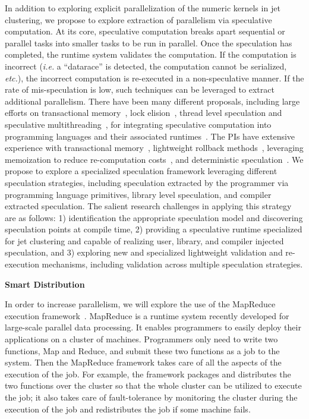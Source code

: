 \documentclass[times,11pt]{article}
\begin{document}
In addition to exploring explicit parallelization of the numeric kernels in jet clustering, we
propose to explore extraction of parallelism via speculative computation. At its core, speculative
computation breaks apart sequential or parallel tasks into smaller tasks to be run in parallel. Once
the speculation has completed, the runtime system validates the computation. If the computation is
incorrect ({\em i.e.} a ``datarace'' is detected, the computation cannot be serialized, {\em etc.}), the
incorrect computation is re-executed in a non-speculative manner.  If the rate of mis-speculation
is low, such techniques can be leveraged to extract additional
parallelism. 
There have been many different
proposals, including large efforts on transactional memory~\cite{},
lock elision~\cite{}, thread level speculation and speculative
multithreading~\cite{},
 for integrating speculative computation into programming languages
 and their associated runtimes~\cite{}.
The PIs have extensive experience with transactional memory~\cite{trans}, lightweight rollback methods~\cite{stab}, 
leveraging memoization to reduce re-computation costs~\cite{memo1, memo2},
and deterministic speculation~\cite{iso}. We propose to explore a specialized speculation framework leveraging different
speculation strategies, including speculation extracted by the programmer via programming language primitives,
library level speculation, and compiler extracted speculation.
The salient research
challenges in applying this strategy are as follows:  1) identification the appropriate speculation model and
discovering speculation points at compile time, 2) providing a speculative runtime specialized for jet clustering
and capable of realizing user, library, and compiler injected speculation, and 3) exploring new and specialized
lightweight validation and re-execution mechanisms, including validation across multiple speculation strategies.



\bigskip
\noindent
{\bf Smart Distribution}
\bigskip

In order to increase parallelism, we will explore the use of the MapReduce
execution framework~\cite{mapreduce-osdi, mapreduce-hadoop}. MapReduce is a
runtime system recently developed for large-scale parallel data processing. It
enables programmers to easily deploy their applications on a cluster of
machines. Programmers only need to write two functions, Map and Reduce, and
submit these two functions as a job to the system. Then the MapReduce framework
takes care of all the aspects of the execution of the job. For example, the
framework packages and distributes the two functions over the cluster so that
the whole cluster can be utilized to execute the job; it also takes care of
fault-tolerance by monitoring the cluster during the execution of the job and
redistributes the job if some machine fails.
\end{document}
